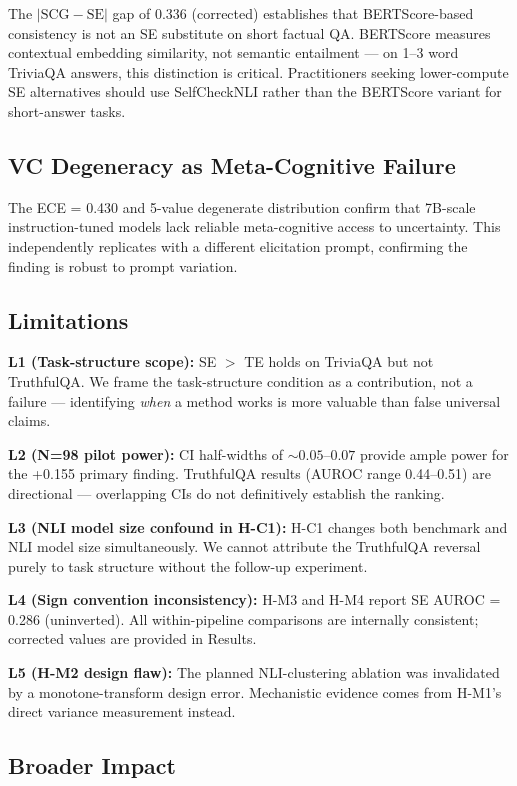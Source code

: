 The $|\text{SCG} - \text{SE}|$ gap of 0.336 (corrected) establishes that BERTScore-based consistency is not an SE substitute on short factual QA.
BERTScore measures contextual embedding similarity, not semantic entailment --- on 1--3 word TriviaQA answers, this distinction is critical.
Practitioners seeking lower-compute SE alternatives should use SelfCheckNLI rather than the BERTScore variant for short-answer tasks.

\subsection{VC Degeneracy as Meta-Cognitive Failure}

The ECE = 0.430 and 5-value degenerate distribution confirm that 7B-scale instruction-tuned models lack reliable meta-cognitive access to uncertainty.
This independently replicates \citet{Xiong2023} with a different elicitation prompt, confirming the finding is robust to prompt variation.

\subsection{Limitations}

\textbf{L1 (Task-structure scope):} SE $>$ TE holds on TriviaQA but not TruthfulQA.
We frame the task-structure condition as a contribution, not a failure --- identifying \textit{when} a method works is more valuable than false universal claims.

\textbf{L2 (N=98 pilot power):} CI half-widths of ${\sim}0.05$--$0.07$ provide ample power for the +0.155 primary finding.
TruthfulQA results (AUROC range 0.44--0.51) are directional --- overlapping CIs do not definitively establish the ranking.

\textbf{L3 (NLI model size confound in H-C1):} H-C1 changes both benchmark and NLI model size simultaneously.
We cannot attribute the TruthfulQA reversal purely to task structure without the follow-up experiment.

\textbf{L4 (Sign convention inconsistency):} H-M3 and H-M4 report SE AUROC = 0.286 (uninverted).
All within-pipeline comparisons are internally consistent; corrected values are provided in Results.

\textbf{L5 (H-M2 design flaw):} The planned NLI-clustering ablation was invalidated by a monotone-transform design error.
Mechanistic evidence comes from H-M1's direct variance measurement instead.

\subsection{Broader Impact}

